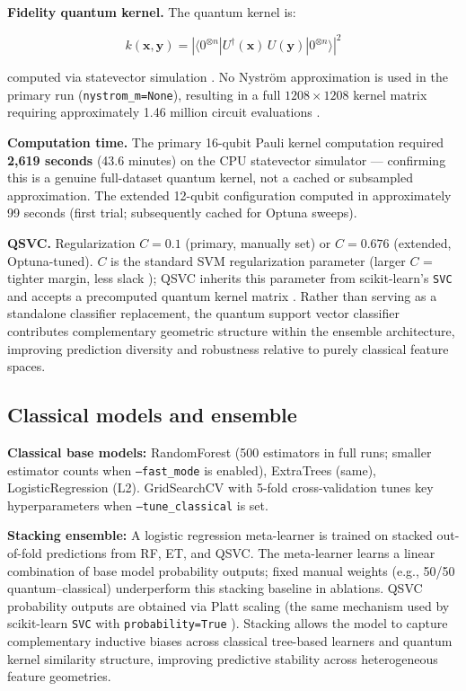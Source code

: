 \documentclass[10pt,twocolumn]{article}
\begin{document}
\textbf{Fidelity quantum kernel.} The quantum kernel is:

\begin{equation}
k(\mathbf{x}, \mathbf{y}) = \left|\langle 0^{\otimes n} | U^\dagger(\mathbf{x})\, U(\mathbf{y}) | 0^{\otimes n} \rangle\right|^2
\end{equation}

computed via statevector simulation \cite{qiskit_aer2023}. No Nystr\"{o}m approximation is used in the primary run (\texttt{nystrom\_m=None}), resulting in a full $1208 \times 1208$ kernel matrix requiring approximately 1.46 million circuit evaluations \cite{williams2001nystrom,qiskit_ml2023}.

\textbf{Computation time.} The primary 16-qubit Pauli kernel computation required \textbf{2,619 seconds} (43.6 minutes) on the CPU statevector simulator \cite{qiskit_aer2023} --- confirming this is a genuine full-dataset quantum kernel, not a cached or subsampled approximation. The extended 12-qubit configuration computed in approximately 99 seconds (first trial; subsequently cached for Optuna sweeps).

\textbf{QSVC.} Regularization $C=0.1$ (primary, manually set) or $C=0.676$ (extended, Optuna-tuned). $C$ is the standard SVM regularization parameter (larger $C$ = tighter margin, less slack \cite{qiskit_ml2023}); QSVC inherits this parameter from scikit-learn's \texttt{SVC} and accepts a precomputed quantum kernel matrix \cite{qiskit_ml2023}.
Rather than serving as a standalone classifier replacement, the quantum support vector classifier contributes complementary geometric structure within the ensemble architecture, improving prediction diversity and robustness relative to purely classical feature spaces.

\subsection{Classical models and ensemble}

\textbf{Classical base models:} RandomForest (500 estimators in full runs; smaller estimator counts when \texttt{--fast\_mode} is enabled), ExtraTrees (same), LogisticRegression (L2). GridSearchCV with 5-fold cross-validation tunes key hyperparameters when \texttt{--tune\_classical} is set.

\textbf{Stacking ensemble:} A logistic regression meta-learner is trained on stacked out-of-fold predictions from RF, ET, and QSVC. The meta-learner learns a linear combination of base model probability outputs; fixed manual weights (e.g., 50/50 quantum--classical) underperform this stacking baseline in ablations. QSVC probability outputs are obtained via Platt scaling \cite{platt1999} (the same mechanism used by scikit-learn \texttt{SVC} with \texttt{probability=True} \cite{qiskit_ml2023}). Stacking allows the model to capture complementary inductive biases across classical tree-based learners and quantum kernel similarity structure, improving predictive stability across heterogeneous feature geometries.
\end{document}
